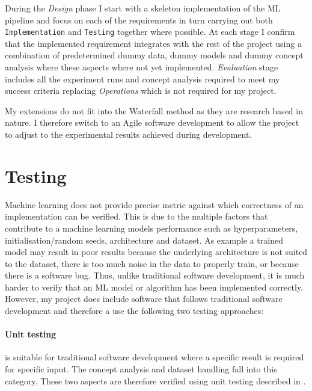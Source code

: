 During the \textit{Design} phase I start with a skeleton implementation of the ML pipeline and focus on each of the requirements in turn carrying out both \texttt{Implementation} and \texttt{Testing} together where possible.
At each stage I confirm that the implemented requirement integrates with the rest of the project using a combination of predetermined dummy data, dummy models and dummy concept analysis where these aspects where not yet implemented.
\textit{Evaluation} stage includes all the experiment runs and concept analysis required to meet my success criteria replacing \textit{Operations} which is not required for my project.

My extensions do not fit into the Waterfall method as they are research based in nature. I therefore switch to an Agile software development \cite{beck2001manifesto} to allow the project to adjust to the experimental results achieved during development.

\section{Testing}
\label{sec:testing}


Machine learning does not provide precise metric against which correctness of an implementation can be verified.
This is due to the multiple factors that contribute to a machine learning models performance such as hyperparameters, initialisation/random seeds, architecture and dataset.
As example a trained model may result in poor results because the underlying architecture is not suited to the dataset, there is too much noise in the data to properly train, or because there is a software bug.
Thus, unlike traditional software development, it is much harder to verify that an ML model or algorithm has been implemented correctly.
However, my project does include software that follows traditional software development and therefore a use the following two testing approaches:

\paragraph{Unit testing}
is suitable for traditional software development where a specific result is required for specific input.
The concept analysis and dataset handling fall into this category.
These two aspects are therefore verified using unit testing described in .

